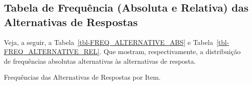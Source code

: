 \documentclass[
  portuguese,
  11pt,
  a4paper,
  DIV=11,
  numbers=noendperiod]{scrreprt}
\begin{document}
\subsection{Tabela de Frequência (Absoluta e Relativa) das Alternativas
de
Respostas}\label{tabela-de-frequuxeancia-absoluta-e-relativa-das-alternativas-de-respostas}

Veja, a seguir, a Tabela~\ref{tbl-FREQ_ALTERNATIVE_ABS} e
Tabela~\ref{tbl-FREQ_ALTERNATIVE_REL}. Que mostram, respectivamente, a
distribuição de frequências absolutas alternativas às alternativas de
resposta.

\begin{table}

\caption{\label{tbl-FREQ_ALTERNATIVE_ABS}Frequências das Alternativas de
Respostas por Item.}

\centering{

}
\end{table}
\end{document}

